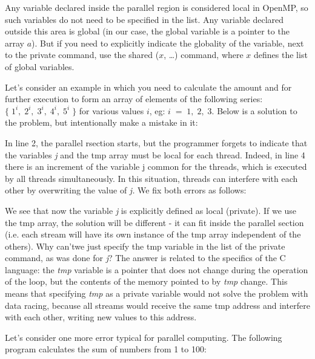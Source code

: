 {	\par Any variable declared inside the parallel region is considered local in OpenMP, so such variables do not need to be specified in the list. Any variable declared outside this area is global (in our case, the global variable is a pointer to the array $a$). But if you need to explicitly indicate the globality of the variable, next to the private command, use the shared ($x$, \ldots) command, where $x$ defines the list of global variables.
	\par Let's consider an example in which you need to calculate the amount and for further execution to form an array of elements of the following series: $\{\;1^i,\;2^i,\;3^i,\;4^i,\;5^i\;\}$ for various values $i$, eg: $i\;=\;1,\;2,\;3$. Below is a solution to the problem, but intentionally make a mistake in it:
	\begin{figure}[H]
		
	\end{figure}
	\par In line 2, the parallel rsection starts, but the programmer forgets to indicate that the variables\textit{ j} and the tmp array must be local for each thread. Indeed, in line 4 there is an increment of the variable j common for the threads, which is executed by all threads simultaneously. In this situation, threads can interfere with each other by overwriting the value of\textit{ j.} We fix both errors as follows:
	\begin{figure}[H]
		
	\end{figure}
	\par We see that now the variable \textit{j} is explicitly defined as local (private). If we use the tmp array, the solution will be different - it can fit inside the parallel section (i.e. each stream will have its own instance of the tmp array independent of the others). Why can'twe just specify the tmp variable in the list of the private command, as was done for \textit{j}? The answer is related to the specifics of the C language: the \textit{tmp} variable is a pointer that does not change during the operation of the loop, but the contents of the memory pointed to by \textit{tmp }change. This means that specifying \textit{tmp} as a private variable would not solve the problem with data racing, because all streams would receive the same tmp address and interfere with each other, writing new values to this address.
	\par Let's consider one more error typical for parallel computing. The following program calculates the sum of numbers from 1 to 100:
}
